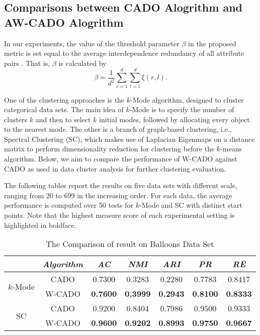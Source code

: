 \documentclass[review]{elsarticle}
\begin{document}
\subsection{Comparisons between CADO Alogrithm and AW-CADO Alogrithm}

In our experiments, the value of the threshold parameter $\beta$ in the proposed metric is set equal to the average interdependence redundancy of all attribute pairs \cite{Jia2014A}. That is, $\beta$ is calculated by
\begin{equation}
\beta = \frac{1}{d^2}\sum_{r=1}^{d}\sum_{l=1}^{d}\xi(r,l).
\label{equ22}
\end{equation}

One of the clustering approaches is the $k$-Mode algorithm, designed to cluster categorical data sets. The main idea of $k$-Mode is to specify the number of clusters $k$ and then to select $k$ initial modes, followed by allocating every object to the nearest mode. The other is a branch of graph-based clustering, i.e., Spectral Clustering (SC), which makes use of Laplacian Eigenmaps on a distance matrix to perform dimensionality reduction for clustering before the $k$-means algorithm. Below, we aim to compare the performance of W-CADO against CADO as used in data cluster analysis for further clustering evaluation.

The following tables report the results on five data sets with different scale, ranging from 20 to 699 in the increasing order. For each data, the average performance is computed over 50 tests for $k$-Mode and SC with distinct start points. Note that the highest measure score of each experimental setting is highlighted in boldface.

\begin{table}[!h]\tabcolsep=0.065in
\centering
\caption{The Comparison of result on Balloons Data Set}
\small
\label{tab:The Clustering Results Comparison on Balloons Data Set}
\begin{tabular}{ccccccc}
\hline
\emph{}&\emph{Algorithm}&\emph{AC}&\emph{NMI}&\emph{ARI}&\emph{PR}&\emph{RE} \\
\hline
\multirow{2}{*}{$k$-Mode} & CADO & 0.7300 & 0.3283 & 0.2280 & 0.7783 & 0.8417\\
    & W-CADO & \textbf{0.7600} & \textbf{0.3999} & \textbf{0.2943} & \textbf{0.8100} & \textbf{0.8333}\\
    \hline
\multirow{2}{*}{SC} & CADO & 0.9200 & 0.8404 & 0.7986 & 0.9500 & 0.9333\\
    & W-CADO & \textbf{0.9600} & \textbf{0.9202} & \textbf{0.8993} & \textbf{0.9750} & \textbf{0.9667}\\
\hline
\end{tabular}
\end{table}
\end{document}
